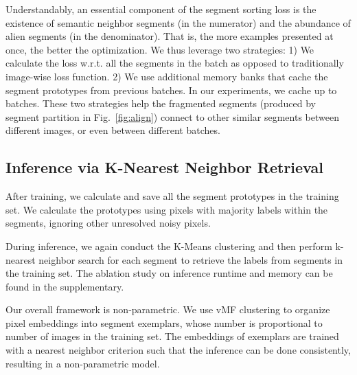 \documentclass[10pt,twocolumn,letterpaper]{article}
\begin{document}
Understandably, an essential component of the segment sorting loss is the existence of semantic neighbor segments (in the numerator) and the abundance of alien segments (in the denominator).
That is, the more examples presented at once, the better the optimization.
We thus leverage two strategies:
1) We calculate the loss w.r.t. all the segments in the batch as opposed to traditionally image-wise loss function.
2) We use additional memory banks that cache the segment prototypes from previous batches.
In our experiments, we cache up to  batches.
These two strategies help the fragmented segments (produced by segment partition in Fig.~\ref{fig:align}) connect to other similar segments between different images, or even between different batches.







\subsection{Inference via K-Nearest Neighbor Retrieval}
\label{sec:inference}

After training, we calculate and save all the segment prototypes in the training set.
We calculate the prototypes using pixels with majority labels within the segments, ignoring other unresolved noisy pixels.

During inference, we again conduct the K-Means clustering and then perform k-nearest neighbor search for each segment to retrieve the labels from segments in the training set.
The ablation study on inference runtime and memory can be found in the supplementary.



Our overall framework is non-parametric. We use vMF clustering to organize pixel embeddings into segment exemplars, whose number is proportional to number of images in the training set. The embeddings of exemplars are trained with a nearest neighbor criterion such that the inference can be done consistently, resulting in a non-parametric model.
\end{document}
